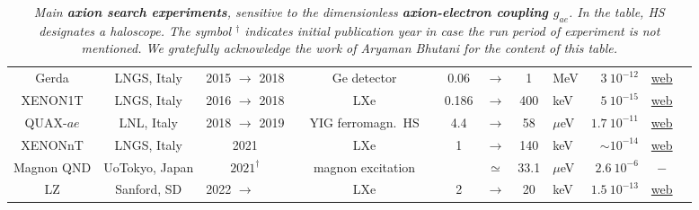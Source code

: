 \begin{table}[!th]
\begin{center}
{\begin{tabular}{ccccccclrcc}
        \rule{0pt}{1ex}
        {\sc Gerda} & LNGS, Italy & 2015 $\to$ 2018 &  Ge detector & 0.06 &$\to$ & 1 &MeV & $3\ 10^{-12}$ & \href{https://www.mpi-hd.mpg.de/gerda/}{web} & \cite{GERDA}
        \\

        \rule{0pt}{1ex}
        {\sc XENON1T} & LNGS, Italy & 2016 $\to$ 2018 &LXe & 0.186 &$\to$ & 400 &keV & $5\ 10^{-15}$ & \href{https://xenonexperiment.org/}{web} & \cite{Xenon-1T}
        \\

        \rule{0pt}{1ex}
        {\sc QUAX-$ae$} & LNL, Italy & 2018 $\to$ 2019 &~~YIG ferromagn.~HS~~& 4.4 &$\to$ &58 &$\mu$eV & $1.7\ 10^{-11}$ & \href{https://www.pd.infn.it/eng/quax/}{web} & \cite{QUAXae}
        \\

        \rule{0pt}{1ex}
        {\sc XENONnT} & LNGS, Italy & 2021 & LXe & 1 &$\to$ &140 &keV & $\sim10^{-14}$ &\href{https://xenonexperiment.org/}{web} & \cite{XenonAnomaly}
        \\
        
        \rule{0pt}{1ex}
        {\sc Magnon QND} & UoTokyo, Japan & $2021^{\dagger}$ & magnon excitation & &$\simeq$ & 33.1 &$\mu$eV & $2.6\ 10^{-6}$ & $-$ & \cite{MagnonQND}
        \\

        \rule{0pt}{1ex}
        {\sc LZ} & Sanford, SD & 2022 $\to$ ~~~~ & LXe & 2 &$\to$ & 20 &keV & $1.5\ 10^{-13}$ & \href{https://lz.lbl.gov/}{web} & \cite{LZaxions}
        \\
        \hline\hline
      \end{tabular}}
  \end{center}
    \caption[Main axion-electron experiments]{\label{tab:AxionEexp}\em Main {\bfseries axion search experiments}, sensitive to the dimensionless {\bfseries axion-electron coupling $g_{ae}$}. In the table, HS designates a {\em haloscope}. The symbol $^\dagger$ indicates initial publication year in case the run period of experiment is not mentioned. We gratefully acknowledge the work of Aryaman Bhutani for the content of this table.}
\end{table}


